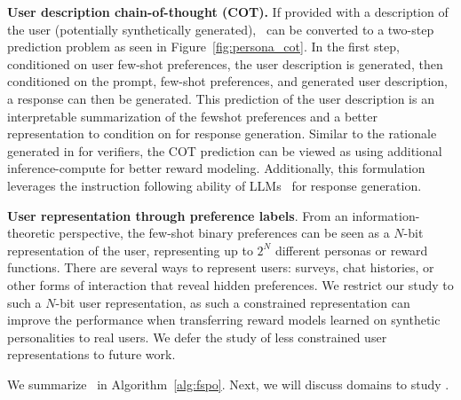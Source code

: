 \noindent \textbf{User description chain-of-thought (COT).} If provided with a description of the user (potentially synthetically generated), \methodname\ can be converted to a two-step prediction problem as seen in Figure~\ref{fig:persona_cot}. In the first step, conditioned on user few-shot preferences, the user description is generated, then conditioned on the prompt, few-shot preferences, and generated user description, a response can then be generated. This prediction of the user description is an interpretable summarization of the fewshot preferences and a better representation to condition on for response generation. Similar to the rationale generated in \citet{zhang2024generativeverifiersrewardmodeling} for verifiers, the COT prediction can be viewed as using additional inference-compute for better reward modeling. Additionally, this formulation leverages the instruction following ability of LLMs~\citep{ouyang2022training} for response generation.

\noindent \textbf{User representation through preference labels}. From an information-theoretic perspective, the few-shot binary preferences can be seen as a $N$-bit representation of the user, representing up to $2^N$ different personas or reward functions. There are several ways to represent users: surveys, chat histories, or other forms of interaction that reveal hidden preferences. We restrict our study to such a $N$-bit user representation, as such a constrained representation can improve the performance when transferring reward models learned on synthetic personalities to real users. We defer the study of less constrained user representations to future work.

We summarize \methodname\ in Algorithm~\ref{alg:fspo}. Next, we will discuss domains to study \methodname.

